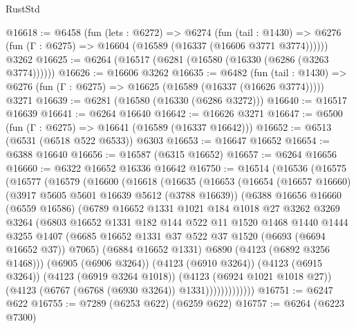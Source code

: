 \begin{lexlean}{RustStd}
\begin{coremodule}
@16618 := @6458
    (fun (lets : @6272) =>
    @6274
      (fun (tail : @1430) =>
      @6276 (fun (Γ : @6275) => @16604 (@16589 (@16337 (@16606 @3771 @3774))))))
    @3262
@16625 := @6264 (@16517 (@6281 (@16580 (@16330 (@6286 (@3263 @3774))))))
@16626 := @16606 @3262
@16635 := @6482
    (fun (tail : @1430) => @6276 (fun (Γ : @6275) => @16625 (@16589 (@16337 (@16626 @3774)))))
    @3271
@16639 := @6281 (@16580 (@16330 (@6286 @3272)))
@16640 := @16517 @16639
@16641 := @6264 @16640
@16642 := @16626 @3271
@16647 := @6500 (fun (Γ : @6275) => @16641 (@16589 (@16337 @16642)))
@16652 := @6513 (@6531 (@6518 @522 @6533)) @6303
@16653 := @16647 @16652
@16654 := @6388 @16640
@16656 := @16587 (@6315 @16652)
@16657 := @6264 @16656
@16660 := @6322 @16652 @16336 @16642
@16750 := @16514
    (@16536
      (@16575
        (@16577
          (@16579
            (@16600
              (@16618
                (@16635
                  (@16653
                    (@16654
                      (@16657 @16660)
                      (@3917 @5605 @5601 @16639 @5612 (@3788 @16639))
                      (@6388
                        @16656
                        @16660
                        (@6559 @16586)
                        (@6789
                          @16652
                          @1331
                          @1021
                          @184
                          @1018
                          @27
                          @3262
                          @3269
                          @3264
                          (@6803
                            @16652
                            @1331
                            @182
                            @144
                            @522
                            @11
                            @1520
                            @1468
                            @1440
                            @1444
                            @3255
                            @1407
                            (@6685 @16652 @1331 @37 @522 @37 @1520 (@6693 (@6694 @16652 @37)) @7065)
                            (@6884 @16652 @1331)
                            @6890
                            (@4123 (@6892 @3256 @1468)))
                          (@6905 (@6906 @3264))
                          (@4123 (@6910 @3264))
                          (@4123 (@6915 @3264))
                          (@4123 (@6919 @3264 @1018))
                          (@4123 (@6924 @1021 @1018 @27))
                          (@4123 (@6767 (@6768 (@6930 @3264)) @1331)))))))))))))
@16751 := @6247 @622
@16755 := @7289 (@6253 @622) (@6259 @622)
@16757 := @6264 (@6223 @7300)

\end{coremodule}
\end{lexlean}
